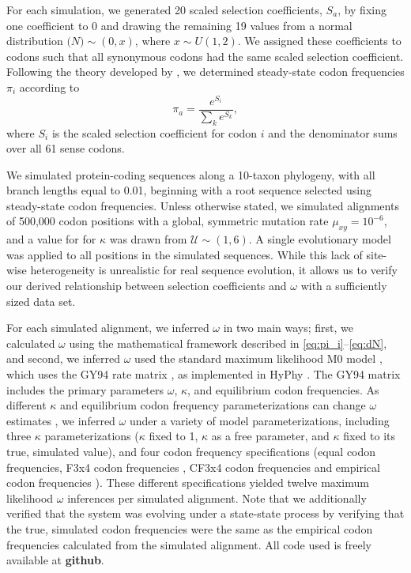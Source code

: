 \documentclass[11pt]{article}
\begin{document}
For each simulation, we generated 20 scaled selection coefficients, $S_a$, by fixing one coefficient to 0 and drawing the remaining 19 values from a normal distribution $\mathcal(N)\sim(0,x)$, where $x \sim U(1,2)$. We assigned these coefficients to codons such that all synonymous codons had the same scaled selection coefficient. Following the theory developed by \cite{SellaHirsh2005}, we determined steady-state codon frequencies $\pi_i$ according to \begin{equation} \pi_a = \frac{e^{S_i}}{\sum_k e^{S_k}}, \end{equation} where $S_i$ is the scaled selection coefficient for codon $i$ and the denominator sums over all 61 sense codons. 
 
We simulated protein-coding sequences along a 10-taxon phylogeny, with all branch lengths equal to 0.01, beginning with a root sequence selected using steady-state codon frequencies. Unless otherwise stated, we simulated alignments of 500,000 codon positions with a global, symmetric mutation rate $\mu_{xy} = 10^{-6}$, and a value for for $\kappa$ was drawn from $\mathcal{U} \sim (1,6)$. A single evolutionary model was applied to all positions in the simulated sequences. While this lack of site-wise heterogeneity is unrealistic for real sequence evolution, it allows us to verify our derived relationship between selection coefficients and $\omega$ with a sufficiently sized data set.

For each simulated alignment, we inferred $\omega$ in two main ways; first, we calculated $\omega$ using the mathematical framework described in \eqref{eq:pi_i}--\eqref{eq:dN}, and second, we inferred $\omega$ used the standard maximum likelihood M0 model \cite{NielsenYang1998}, which uses the GY94 rate matrix \cite{GoldmanYang1994}, as implemented in HyPhy \cite{KosakovskyPondetal2005}. The GY94 matrix includes the primary parameters $\omega$, $\kappa$, and equilibrium codon frequencies. As different $\kappa$ and equilibrium codon frequency parameterizations can change $\omega$ estimates \cite{YN00, Yang2006}, we inferred $\omega$ under a variety of model parameterizations, including three $\kappa$ parameterizations ($\kappa$ fixed to 1, $\kappa$ as a free parameter, and $\kappa$ fixed to its true, simulated value), and four codon frequency specifications (equal codon frequencies,  F3x4 codon frequencies \cite{MuseGaut1994}, CF3x4 codon frequencies \cite{Pond2010} and empirical codon frequencies \cite{GoldmanYang1994}). These different specifications yielded twelve maximum likelihood $\omega$ inferences per simulated alignment. Note that we additionally verified that the system was evolving under a state-state process by verifying that the true, simulated codon frequencies were the same as the empirical codon frequencies calculated from the simulated alignment. All code used is freely available at \textbf{github}. 
\end{document}
